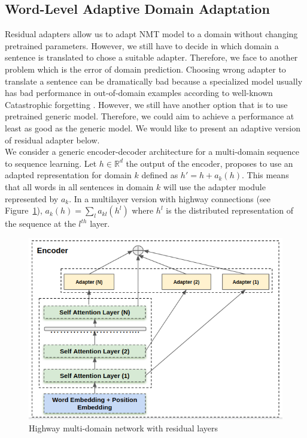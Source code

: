 \documentclass[11pt,a4paper]{article}
\newcommand{\R}{\ensuremath{\mathbb{R}}}
\newcommand{\mpTodo}[1]{\Todo[MP:]{\textcolor{green}{#1}}}
\begin{document}
\subsection{Word-Level Adaptive Domain Adaptation \label{ssec:wada}}
\mpTodo{Formalizing problem, network design, training algorithm}
Residual adapters allow us to adapt NMT model to a domain without changing pretrained parameters. However, we still have to decide in which domain a sentence is translated to chose a suitable adapter. Therefore, we face to another problem which is the error of domain prediction. Choosing wrong adapter to translate a sentence can be dramatically bad because a specialized model usually has bad performance in out-of-domain examples according to well-known Catastrophic forgetting \cite{McCloskey89catastrophic}. However, we still have another option that is to use pretrained generic model. Therefore, we could aim to achieve a performance at least as good as the generic model. We would like to present an adaptive version of residual adapter below.
\\
We consider a generic encoder-decoder architecture for a multi-domain sequence to sequence learning. Let $h \in \R^d$ the output of the encoder, \cite{Bapna19simple} proposes to use an adapted representation for domain $k$ defined as $h' = h + a_k(h)$. This means that all words in all sentences in domain $k$ will use the adapter module represented by $a_k$. In a multilayer version with highway connections (see Figure~\ref{fig:hrl-architecture}), $a_k(h) = \sum_{l} a_{kl}(h^l)$ where $h^l$ is the distributed representation of the sequence at the $l^{th}$ layer.
\begin{figure}[htbp]
  \centering
  \includegraphics[scale=0.3]{fig/highway_residual}
  \caption{Highway multi-domain network with residual layers}
\label{fig:hrl-architecture}
\end{figure}
\end{document}
